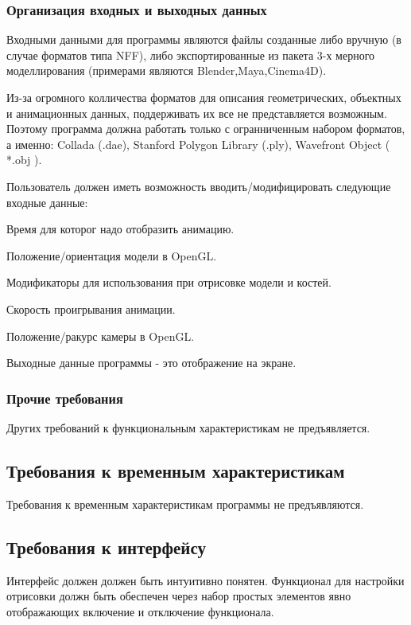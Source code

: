 \subsubsection{Организация входных и выходных данных}
\begin{my_enumerate}
\item Входными данными для программы являются файлы созданные  либо вручную (в случае форматов типа NFF), либо экспортированные из пакета 3-х мерного моделлирования (примерами являются Blender,Maya,Cinema4D).
\item Из-за огромного колличества форматов для описания геометрических, объектных и анимационных данных, поддерживать их все не представляется возможным. Поэтому программа должна работать только с огранниченным набором форматов, а именно: Collada (.dae), Stanford  Polygon Library (.ply), Wavefront Object ( *.obj ).
\item Пользователь должен иметь возможность вводить/модифицировать следующие входные данные:
\begin{my_enumerate}
\item Время для которог надо отобразить анимацию.
\item Положение/ориентация модели в OpenGL.
\item Модификаторы для использования при отрисовке модели и костей.
\item Скорость проигрывания анимации.
\item Положение/ракурс камеры в OpenGL.
\end{my_enumerate}
\item Выходные данные программы - это отображение на экране.
\end{my_enumerate}

\subsubsection{Прочие требования}
Других требований к функциональным характеристикам не предъявляется. 

\subsection{Требования к временным характеристикам}
Требования к временным характеристикам программы не предъявляются.


\subsection{Требования к интерфейсу}
Интерфейс должен должен быть интуитивно понятен.
Функционал для настройки отрисовки должн быть обеспечен через набор 
простых элементов явно отображающих включение и отключение функционала.


